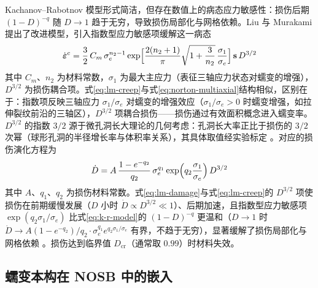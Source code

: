 Kachanov--Rabotnov 模型形式简洁，但存在数值上的病态应力敏感性：损伤后期 $(1-D)^{-q}$ 随 $D\to1$ 趋于无穷，导致损伤局部化与网格依赖。Liu 与 Murakami 提出了改进模型，引入指数型应力敏感项缓解这一病态 \cite{LiuMurakami1998}
\begin{equation}
  \dot{\boldsymbol{\varepsilon}}^{c}
  =\frac{3}{2}\,C_{m}\,\sigma_{e}^{n_{2}-1}
  \exp\Bigl[\frac{2(n_{2}+1)}{\pi}\sqrt{1+\frac{3}{n_{2}}}\,\frac{\sigma_{1}}{\sigma_{e}}\Bigr]
  \,\mathbf{s}\,D^{3/2}
  \label{eq:lm-creep}
\end{equation}
其中 $C_{m}$、$n_{2}$ 为材料常数，$\sigma_{1}$ 为最大主应力（表征三轴应力状态对蠕变的增强），$D^{3/2}$ 为损伤耦合项。式\eqref{eq:lm-creep}与式\eqref{eq:norton-multiaxial}结构相似，区别在于：指数项反映三轴应力 $\sigma_{1}/\sigma_{e}$ 对蠕变的增强效应（$\sigma_{1}/\sigma_{e}>0$ 时蠕变增强，如拉伸裂纹前沿的三轴区），$D^{3/2}$ 项耦合损伤——损伤通过有效面积概念进入蠕变率。$D^{3/2}$ 的指数 $3/2$ 源于微孔洞长大理论的几何考虑：孔洞长大率正比于损伤的 $3/2$ 次幂（球形孔洞的半径增长率与体积率关系），其具体取值经实验标定 \cite{LiuMurakami1998}。对应的损伤演化方程为
\begin{equation}
  \dot{D}=A\,\frac{1-e^{-q_{2}}}{q_{2}}\,\sigma_{e}^{q_{1}}
  \exp\Bigl(q_{2}\frac{\sigma_{1}}{\sigma_{e}}\Bigr)\,D^{3/2}
  \label{eq:lm-damage}
\end{equation}
其中 $A$、$q_{1}$、$q_{2}$ 为损伤材料常数。式\eqref{eq:lm-damage}与式\eqref{eq:lm-creep}的 $D^{3/2}$ 项使损伤在前期缓慢发展（$D$ 小时 $\dot{D}\propto D^{3/2}\ll1$）、后期加速，且指数型应力敏感项 $\exp(q_{2}\sigma_{1}/\sigma_{e})$ 比式\eqref{eq:k-r-model}的 $(1-D)^{-q}$ 更温和（$D\to1$ 时 $\dot{D}\to A(1-e^{-q_{2}})/q_{2}\cdot\sigma_{e}^{q_{1}}e^{q_{2}\sigma_{1}/\sigma_{e}}$ 有界，不趋于无穷），显著缓解了损伤局部化与网格依赖 \cite{LiuMurakami1998}。损伤达到临界值 $D_{\mathrm{cr}}$（通常取 $0.99$）时材料失效。

\subsection{蠕变本构在 NOSB 中的嵌入}\label{sec:creep-nosb}

